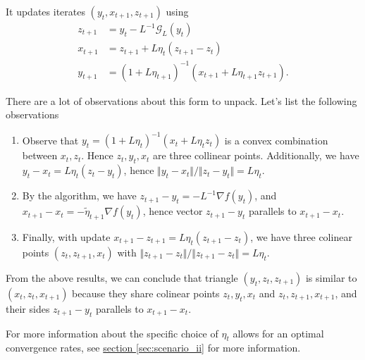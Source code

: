 \documentclass[12pt]{article}
\begin{document}
            \begin{definition}
            \label{def:ag_form_similar_tria_I}
                It updates iterates $(y_t, x_{t + 1}, z_{t + 1})$ using 
                \begin{align*}
                    z_{t + 1} &= y_t - L^{-1} \mathcal G_L(y_t) 
                    \\
                    x_{t + 1} &= z_{t + 1} + L\eta_t (z_{t + 1} - z_t)
                    \\
                    y_{t + 1} &= 
                    (1 + L\eta_{t + 1})^{-1}
                    (
                    x_{t + 1} + L\eta_{t + 1}z_{t + 1}
                    ). 
                \end{align*}
            \end{definition}
            \begin{observation}
                There are a lot of observations about this form to unpack. 
                Let's list the following observations
                \begin{enumerate}
                    \item Observe that $y_t = (1 + L\eta_t)^{-1}(x_t + L\eta_t z_t)$ is a convex combination between $x_t, z_t$. Hence $z_t, y_t, x_t$ are three collinear points. Additionally, we have $y_t - x_t = L\eta_t (z_t - y_t)$, hence $\Vert y_t - x_t\Vert/\Vert z_t - y_t\Vert = L\eta_t$. 
                    \item By the algorithm, we have $z_{t + 1} - y_t = - L^{-1} \nabla f(y_t)$, and $x_{t + 1} - x_t = - \tilde \eta_{t + 1} \nabla f(y_t)$, hence vector $z_{t + 1} - y_t$ parallels to $x_{t + 1} - x_t$. 
                    \item Finally, with update $x_{t +1} - z_{t + 1} = L\eta_t (z_{t +1} - z_t)$, we have three colinear points $(z_t, z_{t + 1}, x_t)$ with $\Vert z_{t + 1} - z_t\Vert/\Vert z_{t +1 } - z_t\Vert = L\eta_t$. 
                \end{enumerate}
                From the above results, we can conclude that triangle $(y_t, z_t, z_{t + 1})$ is similar to $(x_t, z_t, x_{t + 1})$ because they share colinear points $z_t, y_t, x_t$ and $z_t, z_{t + 1}, x_{t + 1}$, and their sides $z_{t + 1} - y_t$ parallels to $x_{t + 1} - x_t$. 
            \end{observation}
            \begin{remark}
                For more information about the specific choice of $\eta_t$ allows for an optimal convergence rates, see 
                \hyperref[sec:scenario_ii]{section \ref*{sec:scenario_ii}} for more information. 
            \end{remark}
\end{document}
